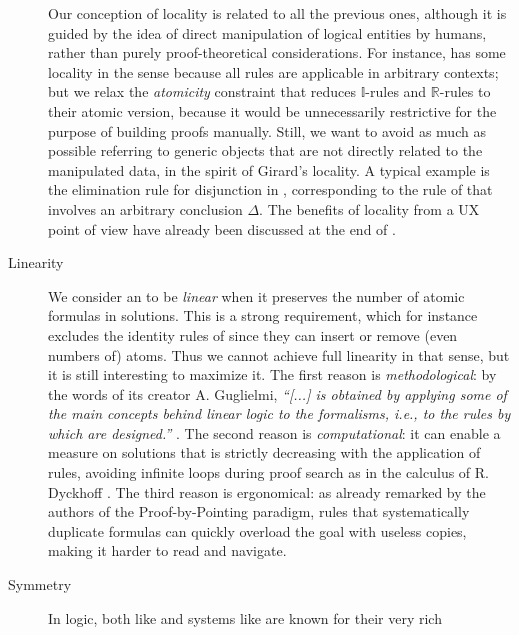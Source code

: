 \begin{description}
    Our conception of locality is related to all the previous ones, although it
    is guided by the idea of direct manipulation of logical entities by humans,
    rather than purely proof-theoretical considerations. For instance, 
    has some locality in the  sense because all rules are
    applicable in arbitrary contexts; but we relax the \emph{atomicity}
    constraint that reduces $\mathbb{I}$-rules and $\mathbb{R}$-rules to their
    atomic version, because it would be unnecessarily restrictive for the
    purpose of building proofs manually. Still, we want to avoid as much as
    possible referring to generic objects that are not directly related to the
    manipulated data, in the spirit of Girard's locality. A typical example is
    the elimination rule for disjunction in , corresponding to
    the {\rsf{{\lor}{-}}} rule of  that involves an arbitrary
    conclusion $\Delta$. The benefits of locality from a UX point of view have
    already been discussed at the end of .
  \item[Linearity] 
    We consider an  to be \emph{linear} when it preserves the
    number of atomic formulas in solutions. This is a strong requirement, which
    for instance excludes the identity rules of  since they can insert
    or remove (even numbers of) atoms. Thus we cannot achieve full linearity in
    that sense, but it is still interesting to maximize it. The first reason is
    \emph{methodological}: by the words of its creator A. Guglielmi,
    \textit{``[...]  is obtained by applying some of the main
    concepts behind linear logic to the formalisms, i.e., to the rules by which
     are designed.''} . The second reason
    is \emph{computational}: it can enable a measure on solutions that is
    strictly decreasing with the application of rules, avoiding infinite loops
    during proof search as in the calculus  of R. Dyckhoff
    \cite{dyckhoff_contraction-free_1992}. The third reason is ergonomical: as
    already remarked by the authors of the Proof-by-Pointing
    paradigm, rules that systematically
    duplicate formulas can quickly overload the goal with useless copies, making
    it harder to read and navigate.
  \item[Symmetry] 
    In  logic, both  like  and  systems like  are known for their very rich

\end{description}
